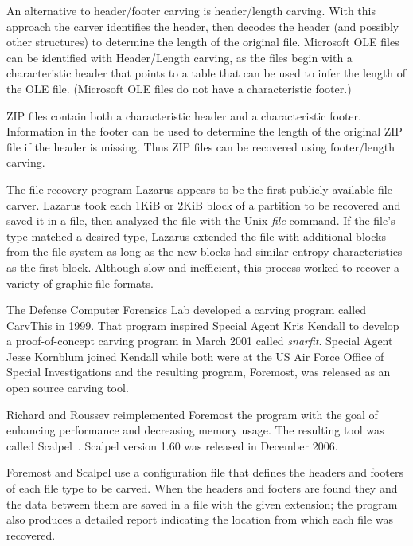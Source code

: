 \documentclass[11pt,letter]{article}
\begin{document}
An alternative to header/footer carving is header/length carving. With
this approach the carver identifies the header, then decodes the
header (and possibly other structures) to determine the length of the
original file. Microsoft OLE files can be identified with
Header/Length carving, as the files begin with a characteristic header
that points to a table that can be used to infer the length of the
OLE file. (Microsoft OLE files do not have a characteristic footer.)

ZIP files contain both a characteristic header and a characteristic
footer. Information in the footer can be used to determine the length
of the original ZIP file if the header is missing. Thus ZIP files can
be recovered using footer/length carving.



The file recovery program Lazarus\cite{lazarus} appears to be the
first publicly available file carver. Lazarus took each 1KiB or 2KiB
block of a partition to be recovered and saved it in a file, then
analyzed the file with the Unix \emph{file} command. If the file's
type matched a desired type, Lazarus extended the file with
additional blocks from the file system as long as the new blocks had
similar entropy characteristics as the first block. Although slow and
inefficient, this process worked to recover a variety of graphic file
formats.

The Defense Computer Forensics Lab developed a carving program called
CarvThis in 1999.  That program inspired Special Agent Kris Kendall to
develop a proof-of-concept carving program in March 2001 called
\emph{snarfit}. Special Agent Jesse Kornblum joined Kendall while both
were at the US Air Force Office of Special Investigations and the
resulting program, Foremost, was released as an open source carving
tool. 

Richard and Roussev reimplemented Foremost the program with the goal of
enhancing performance and decreasing memory usage. The resulting tool
was called Scalpel~\cite{scalpel}. Scalpel version 1.60 was
released in December 2006.

Foremost and Scalpel use a configuration file that defines
the headers and footers of each file type to be carved. When the
headers and footers are found they and the data between them are saved
in a file with the given extension; the program also produces a
detailed report
indicating the location from which each file was recovered.
\end{document}
